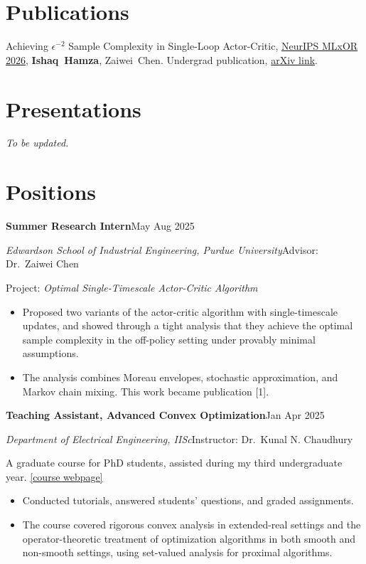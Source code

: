 \documentclass[11pt,letterpaper]{article}
\newcommand{\entry}[2]{\needspace{6\baselineskip}\textbf{#1}\hfill #2\par}
\newcommand{\sub}[2]{{\itshape #1}\hfill{#2}\par}
\newcommand{\gap}{\vspace{8pt}}
\begin{document}
\section*{Publications}
\begin{enumerate}[label={[\arabic*]}]
  \item Achieving $\epsilon^{-2}$ Sample Complexity in Single-Loop Actor-Critic,
        \href{https://openreview.net/forum?id=ALtp3rFOx7}{NeurIPS MLxOR 2026}, \textbf{Ishaq~Hamza}, Zaiwei~Chen.
        Undergrad publication, \href{https://arxiv.org/abs/2605.13639}{arXiv link}.
\end{enumerate}

\section*{Presentations}
\textit{To be updated.}

\section*{Positions}
\entry{Summer Research Intern}{May \textendash{} Aug 2025}
\sub{Edwardson School of Industrial Engineering, Purdue University}{Advisor: Dr.~Zaiwei Chen}
Project: \textit{Optimal Single-Timescale Actor-Critic Algorithm}
\begin{itemize}
  \item Proposed two variants of the actor-critic algorithm with single-timescale updates, and showed through
        a tight analysis that they achieve the optimal sample complexity in the off-policy setting under
        provably minimal assumptions.
  \item The analysis combines Moreau envelopes, stochastic approximation, and Markov chain mixing.
        This work became publication [1].
\end{itemize}

\gap
\entry{Teaching Assistant, Advanced Convex Optimization}{Jan \textendash{} Apr 2025}
\sub{Department of Electrical Engineering, IISc}{Instructor: Dr.~Kunal N. Chaudhury}
A graduate course for PhD students, assisted during my third undergraduate year.
\href{https://sites.google.com/site/kunalnchaudhury/Teaching/aco-2025}{[course webpage]}
\begin{itemize}
  \item Conducted tutorials, answered students' questions, and graded assignments.
  \item The course covered rigorous convex analysis in extended-real settings and the operator-theoretic
        treatment of optimization algorithms in both smooth and non-smooth settings, using set-valued
        analysis for proximal algorithms.
\end{itemize}
\end{document}
